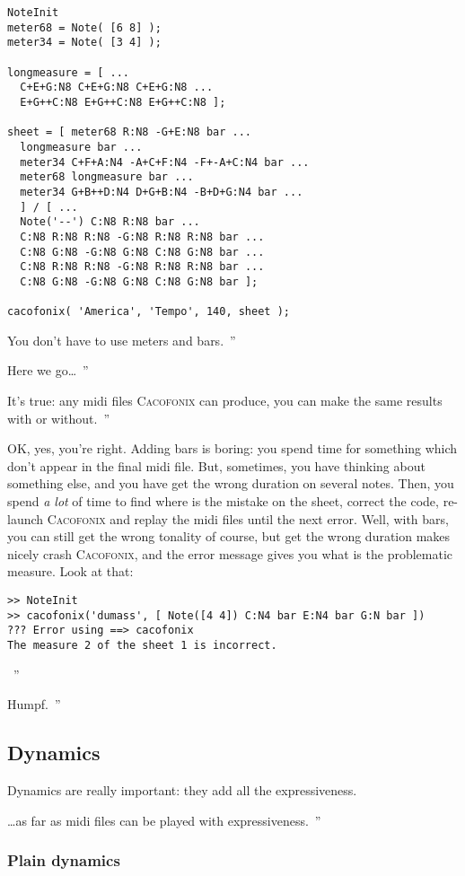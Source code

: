 \documentclass{article}
\newcommand{\cacofonix}{\textsc{Cacofonix}\xspace}
\newenvironment{meenv}{ \par \noindent \makebox[6em][r]{ \textcolor{mecolor}{Me}: `` --~}}{~''}
\newenvironment{myselfenv}{ \par \noindent \makebox[6em][r]{ \textcolor{myselfcolor}{Myself}: `` --~}}{~''}
\newcommand{\me}[1]{\begin{meenv}#1\end{meenv}}
\newcommand{\myself}[1]{\begin{myselfenv}#1\end{myselfenv}}
\begin{document}
\begin{lstlisting}
NoteInit
meter68 = Note( [6 8] );
meter34 = Note( [3 4] );

longmeasure = [ ...
  C+E+G:N8 C+E+G:N8 C+E+G:N8 ...
  E+G++C:N8 E+G++C:N8 E+G++C:N8 ];

sheet = [ meter68 R:N8 -G+E:N8 bar ...
  longmeasure bar ...
  meter34 C+F+A:N4 -A+C+F:N4 -F+-A+C:N4 bar ...
  meter68 longmeasure bar ...
  meter34 G+B++D:N4 D+G+B:N4 -B+D+G:N4 bar ...
  ] / [ ...
  Note('--') C:N8 R:N8 bar ...
  C:N8 R:N8 R:N8 -G:N8 R:N8 R:N8 bar ...
  C:N8 G:N8 -G:N8 G:N8 C:N8 G:N8 bar ...
  C:N8 R:N8 R:N8 -G:N8 R:N8 R:N8 bar ...
  C:N8 G:N8 -G:N8 G:N8 C:N8 G:N8 bar ];

cacofonix( 'America', 'Tempo', 140, sheet );
\end{lstlisting}

\me{You don't have to use meters and bars.}
\myself{Here we go\dots}
\me{It's true: any midi files \cacofonix can produce, you can make the same results with or without.}
\begin{myselfenv}%
  OK, yes, you're right. Adding bars is boring: you spend time for something which don't appear in the final midi file. But, sometimes, you have thinking about something else, and you have get the wrong duration on several notes. Then, you spend \emph{a lot} of time to find where is the mistake on the sheet, correct the code, re-launch \cacofonix and replay the midi files until the next error. Well, with bars, you can still get the wrong tonality of course, but get the wrong duration makes nicely crash \cacofonix, and the error message gives you what is the problematic measure. Look at that:
\begin{lstlisting}
>> NoteInit
>> cacofonix('dumass', [ Note([4 4]) C:N4 bar E:N4 bar G:N bar ])
??? Error using ==> cacofonix
The measure 2 of the sheet 1 is incorrect.
\end{lstlisting}%
\end{myselfenv}
\me{Humpf.}

\subsection{Dynamics}
\label{sec:Dynamics}

Dynamics are really important: they add all the expressiveness.
\me{\dots as far as midi files can be played with expressiveness.}

\subsubsection{Plain dynamics}
\label{sec:PlainDynamics}
\end{document}
